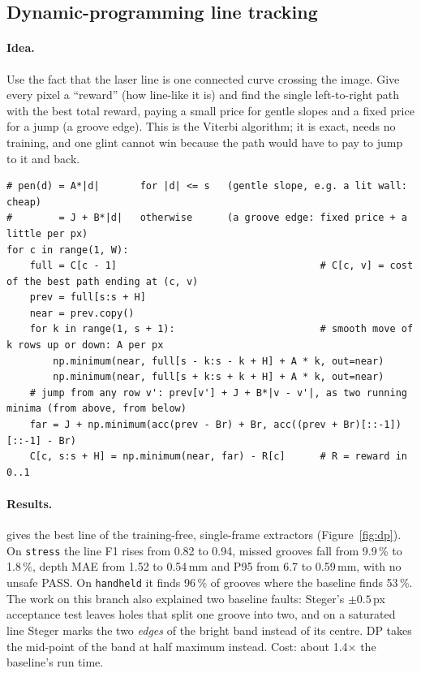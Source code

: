 \subsection{Dynamic-programming line tracking}\label{sec:dp}

\paragraph{Idea.} Use the fact that the laser line is one connected curve crossing the image. Give every pixel a
``reward'' (how line-like it is) and find the single left-to-right path with the best total reward, paying a small
price for gentle slopes and a fixed price for a jump (a groove edge). This is the Viterbi algorithm; it is exact,
needs no training, and one glint cannot win because the path would have to pay to jump to it and back.

\begin{lstlisting}[caption={Core of the Viterbi pass (\texttt{algos/dp\_dense.py}): cost of the best path ending at each pixel, column by column.}]
# pen(d) = A*|d|       for |d| <= s   (gentle slope, e.g. a lit wall: cheap)
#        = J + B*|d|   otherwise      (a groove edge: fixed price + a little per px)
for c in range(1, W):
    full = C[c - 1]                                   # C[c, v] = cost of the best path ending at (c, v)
    prev = full[s:s + H]
    near = prev.copy()
    for k in range(1, s + 1):                         # smooth move of k rows up or down: A per px
        np.minimum(near, full[s - k:s - k + H] + A * k, out=near)
        np.minimum(near, full[s + k:s + k + H] + A * k, out=near)
    # jump from any row v': prev[v'] + J + B*|v - v'|, as two running minima (from above, from below)
    far = J + np.minimum(acc(prev - Br) + Br, acc((prev + Br)[::-1])[::-1] - Br)
    C[c, s:s + H] = np.minimum(near, far) - R[c]      # R = reward in 0..1
\end{lstlisting}

\paragraph{Results.}  gives the best line of the training-free, single-frame extractors
(Figure~\ref{fig:dp}). On \texttt{stress} the line F1 rises from 0.82 to 0.94, missed grooves fall from 9.9\,\% to
1.8\,\%, depth MAE from 1.52 to 0.54\,mm and P95 from 6.7 to 0.59\,mm, with no unsafe PASS. On \texttt{handheld}
it finds 96\,\% of grooves where the baseline finds 53\,\%. The work on this branch also explained two baseline
faults: Steger's $\pm0.5$\,px acceptance test leaves holes that split one groove into two, and on a saturated line
Steger marks the two \emph{edges} of the bright band instead of its centre. DP takes the mid-point of the band at
half maximum instead. Cost: about 1.4$\times$ the baseline's run time.

